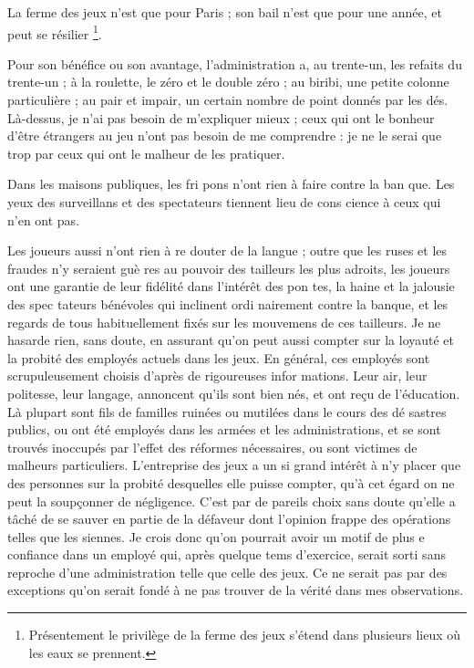 La ferme des jeux n'est que pour
Paris ; son bail n'est que pour une
année, et peut se résilier
\footnote{Présentement le privilège de la ferme des jeux
s'étend dans plusieurs lieux où les eaux se prennent.}.

Pour son bénéfice ou son avantage,
l'administration a, au trente-un, les 
refaits du trente-un ; à la roulette, le
zéro et le double zéro ; au biribi, une
petite colonne particulière ; au pair
et impair, un certain nombre de
point donnés par les dés. Là-dessus,
je n'ai pas besoin de m'expliquer
mieux ; ceux qui ont le bonheur d'être
étrangers au jeu n'ont pas besoin de
me comprendre : je ne le serai que
trop par ceux qui ont le malheur de
les pratiquer.

Dans les maisons publiques, les fri%
pons n'ont rien à faire contre la ban%
que. Les yeux des surveillans et des
spectateurs tiennent lieu de cons%
cience à ceux qui n'en ont pas.

Les joueurs aussi n'ont rien à re%
douter de la langue ; outre que les
ruses et les fraudes n'y seraient guè%
res au pouvoir des tailleurs les plus
adroits, les joueurs ont une garantie
de leur fidélité dans l'intérêt des pon%
tes, la haine et la jalousie des spec%
tateurs bénévoles qui inclinent ordi%
nairement contre la banque, et les
regards de tous habituellement fixés
sur les mouvemens de ces tailleurs.
Je ne hasarde rien, sans doute, en
assurant qu'on peut aussi compter sur
la loyauté et la probité des employés
actuels dans les jeux. En général,
ces employés sont scrupuleusement
choisis d'après de rigoureuses infor%
mations. Leur air, leur politesse, leur
langage, annoncent qu'ils sont bien
nés, et ont reçu de l'éducation. Là
plupart sont fils de familles ruinées
ou mutilées dans le cours des dé%
sastres publics, ou ont été employés 
dans les armées et les administrations,
et se sont trouvés inoccupés par l'effet
des réformes nécessaires, ou sont
victimes de malheurs particuliers.
L'entreprise des jeux a un si grand
intérêt à n'y placer que des personnes
sur la probité desquelles elle puisse
compter, qu'à cet égard on ne peut
la soupçonner de négligence. C'est
par de pareils choix sans doute qu'elle
a tâché de se sauver en partie de la
défaveur dont l'opinion frappe des
opérations telles que les siennes. Je
crois donc qu'on pourrait avoir un
motif de plus e confiance dans un
employé qui, après quelque tems
d'exercice, serait sorti sans reproche
d'une administration telle que celle
des jeux. Ce ne serait pas par des
exceptions qu'on serait fondé à ne
pas trouver de la vérité dans mes
observations.

